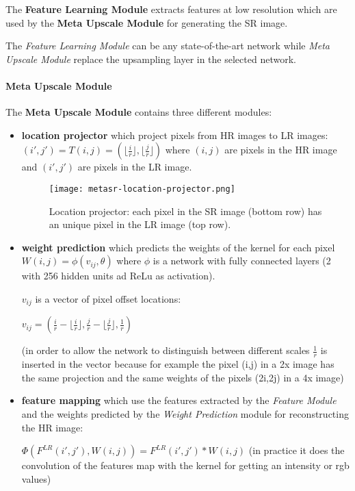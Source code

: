 The \textbf{Feature Learning Module} extracts features at low resolution which are used by the \textbf{Meta Upscale Module} for generating the SR image.

The \textit{Feature Learning Module} can be any state-of-the-art network while \textit{Meta Upscale Module} replace the upsampling layer in the selected network.

\paragraph{Meta Upscale Module}

The \textbf{Meta Upscale Module} contains three different modules:
\begin{itemize}
    \item \textbf{location projector} which project pixels from HR images to LR images: $(i',j') = T(i,j) = (\lfloor\frac{i}{r}\rfloor,\lfloor\frac{j}{r}\rfloor)$ where $(i,j)$ are pixels in the HR image and $(i',j')$ are pixels in the LR image.
    \begin{figure}[H]
        \centering
        \texttt{[image: metasr-location-projector.png]}
        \caption{Location projector: each pixel in the SR image (bottom row) has an unique pixel in the LR image (top row).}
    \end{figure}

    \item \textbf{weight prediction} which predicts the weights of the kernel for each pixel $W(i,j)=\phi(v_{ij},\theta)$ where $\phi$ is a network with fully connected layers (2 with 256 hidden units ad ReLu as activation).
    
    $v_{ij}$ is a vector of pixel offset locations:
    
    $v_{ij} = (\frac{i}{r}-\lfloor\frac{i}{r}\rfloor, \frac{j}{r}-\lfloor\frac{j}{r}\rfloor, \frac{1}{r})$

    (in order to allow the network to distinguish between different scales $\frac{1}{r}$ is inserted in the vector because for example the pixel (i,j) in a 2x image has the same projection and the same weights of the pixels (2i,2j) in a 4x image)
    
    \item \textbf{feature mapping} which use the features extracted by the \textit{Feature Module} and the weights predicted by the \textit{Weight Prediction} module for reconstructing the HR image:
    
    $\Phi(F^{LR}(i',j'), W(i,j)) = F^{LR}(i',j') \ast W(i,j)$ (in practice it does the convolution of the features map with the kernel for getting an intensity or rgb values)
\end{itemize}



